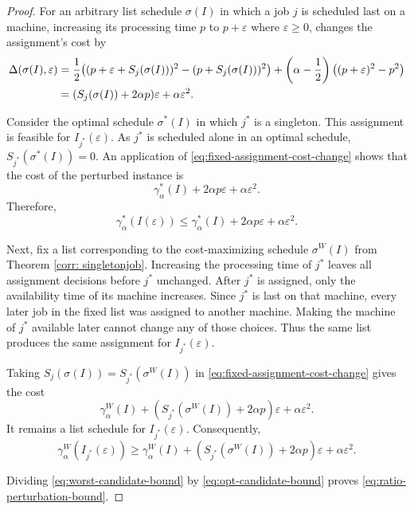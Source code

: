 \documentclass[%
english, titlepage=false %
]{./tum-templates/book/tumbook}
\newcommand{\OptCost}{\gamma_{\alpha}^{*}(I)}
\newcommand{\WorstCost}{\gamma_{\alpha}^{W}(I)}
\begin{document}
\begin{proof}
For an arbitrary list schedule $\sigma(I)$ in which a job $j$ is scheduled last on
a machine, increasing its processing time $p$ to
$p+\varepsilon$ where $\varepsilon \ge 0$, changes the assignment's cost by
\begin{align}
    \Delta(\sigma(I),\varepsilon)
      &=
      \frac12\bigl((p+\varepsilon+S_{j}(\sigma(I)))^2-(p+S_{j}(\sigma(I)))^2\bigr)
      +
      \left(\alpha-\frac12\right)
      \bigl((p+\varepsilon)^2-p^2\bigr)
      \notag\\
      &=(S_{j}(\sigma(I))+2\alpha p)\varepsilon+\alpha\varepsilon^2.
    \label{eq:fixed-assignment-cost-change}
\end{align}

Consider the optimal schedule $\sigma^*(I)$ in which $j^*$ is
a singleton. This assignment is feasible for $I_{j^*}(\varepsilon)$.
As $j^*$ is scheduled alone in an optimal schedule, $S_{j^*}(\sigma^{*}(I))=0$. An application of \eqref{eq:fixed-assignment-cost-change} shows that
the cost of the perturbed instance is
\[
    \OptCost+2\alpha p\varepsilon+\alpha\varepsilon^2.
\]
Therefore,
\begin{equation}
    \gamma^{*}_{\alpha}(I(\varepsilon))
    \leq
    \OptCost+2\alpha p\varepsilon+\alpha\varepsilon^2.
    \label{eq:opt-candidate-bound}
\end{equation}

Next, fix a list corresponding to the cost-maximizing schedule $\sigma^W(I)$ from Theorem \ref{corr: singletonjob}.
Increasing the processing time of $j^*$ leaves all assignment
decisions before $j^*$ unchanged.  After $j^*$ is assigned,
only the availability time of its machine increases.  Since
$j^*$ is last on that machine, every later job in the fixed list
was assigned to another machine. Making the machine of $j^*$
available later cannot change any of those choices.  Thus the same
list produces the same assignment for $I_{j^*}(\varepsilon)$.

Taking $S_j(\sigma(I))=S_{j^*}(\sigma^{W}(I))$ in \eqref{eq:fixed-assignment-cost-change} gives the
cost
\[
    \WorstCost+(S_{j^*}(\sigma^{W}(I))+2\alpha p)\varepsilon
    +\alpha\varepsilon^2.
\]
It remains a list schedule for $I_{j^*}(\varepsilon)$.
Consequently,
\begin{equation}
    \gamma^{W}_{\alpha}(I_{j^*}(\varepsilon))
    \geq
    \WorstCost+(S_{j^*}(\sigma^{W}(I))+2\alpha p)\varepsilon
    +\alpha\varepsilon^2.
    \label{eq:worst-candidate-bound}
\end{equation}

Dividing \eqref{eq:worst-candidate-bound} by
\eqref{eq:opt-candidate-bound} proves
\eqref{eq:ratio-perturbation-bound}.
\end{proof}
\end{document}
